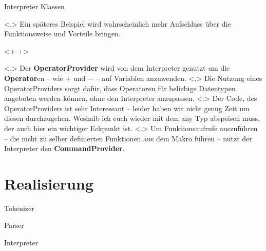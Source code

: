 \begin{frame}{Interpreter Klassen}
\begin{uncoverenv}
          \note[item]<.>{
            Ein späteres Beispiel wird wahrscheinlich mehr Aufschluss über die Funktionsweise und Vorteile bringen.
          }
    \end{uncoverenv}
    \begin{uncoverenv}<+-+>%
          \note[item]<.>{
            Der \textbf{OperatorProvider} wird von dem Interpreter genutzt um die \textbf{Operator}en -- wie $+$ und $-$ -- auf Variablen anzuwenden.
          }
          \note[item]<.>{
            Die Nutzung eines OperatorProviders sorgt dafür, dass Operatoren für beliebige Datentypen angeboten werden können, ohne den Interpreter anzupassen.
          }
          \note[item]<.>{
            Der Code, des OperatorProviders ist sehr Interessant -- leider haben wir nicht genug Zeit um diesen durchzugehen. Weshalb ich euch wieder mit dem any Typ abspeisen muss, der auch hier ein wichtiger Eckpunkt ist.
          }
          \note[item]<.>{
            Um Funktionsaufrufe auszuführen -- die nicht zu selber definierten Funktionen aus dem Makro führen -- nutzt der Interpreter den \textbf{CommandProvider}.
          }
    \end{uncoverenv}
  \end{frame}

\section{Realisierung}

  \begin{frame}{Tokenizer}
  \end{frame}
  \begin{frame}{Parser} %
  \end{frame}
  \begin{frame}{Interpreter}
  \end{frame}


